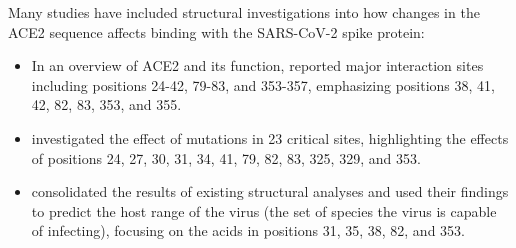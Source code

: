 Many studies have included structural investigations into how changes in the ACE2 sequence affects binding with the SARS-CoV-2 spike protein:
\begin{itemize}
    \setlength\itemsep{0em}
    \item In an overview of ACE2 and its function, \textcite{Li2021} reported major interaction sites including positions 24-42, 79-83, and 353-357, emphasizing positions 38, 41, 42, 82, 83, 353, and 355.
    \item \textcite{Zhao2020} investigated the effect of mutations in 23 critical sites, highlighting the effects of positions 24, 27, 30, 31, 34, 41, 79, 82, 83, 325, 329, and 353.
    \item \textcite{Luan2020} consolidated the results of existing structural analyses and used their findings to predict the host range of the virus (the set of species the virus is capable of infecting), focusing on the acids in positions 31, 35, 38, 82, and 353.
\end{itemize}
